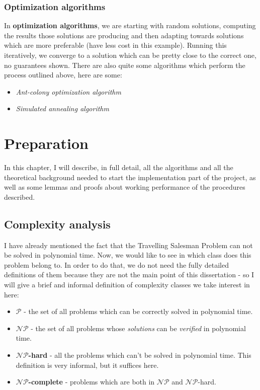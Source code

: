 \documentclass[12pt,twoside,notitlepage]{report}
\begin{document}
\subsection{Optimization algorithms}

In {\bf optimization algorithms}, we are starting with random solutions, computing the results those solutions are producing and then adapting towards solutions which are more preferable (have less cost in this example). Running this iteratively, we converge to a solution which can be pretty close to the correct one, no guarantees shown. There are also quite some algorithms which perform the process outlined above, here are some:

\begin{itemize}

\item {\it Ant-colony optimization algorithm}
\item {\it Simulated annealing algorithm}

\end{itemize}

\cleardoublepage



\chapter{Preparation}

In this chapter, I will describe, in full detail, all the algorithms and all the theoretical background needed to start the implementation part of the project, as well as some lemmas and proofs about working performance of the procedures described.

\section{Complexity analysis}

I have already mentioned the fact that the Travelling Salesman Problem can not be solved in polynomial time. Now, we would like to see in which class does this problem belong to. In order to do that, we do not need the fully detailed definitions of them because they are not the main point of this dissertation - so I will give a brief and informal definition of complexity classes we take interest in here:

\begin{itemize}

\item {\bf $\mathcal{P}$} - the set of all problems which can be correctly solved in polynomial time.
\item {\bf $\mathcal{NP}$} - the set of all problems whose {\it solutions} can be {\it verified} in polynomial time.
\item {\bf $\mathcal{NP}$-hard} - all the problems which can't be solved in polynomial time. This definition is very informal, but it suffices here. %
\item {\bf $\mathcal{NP}$-complete} - problems which are both in $\mathcal{NP}$ and $\mathcal{NP}$-hard.

\end{itemize}
\end{document}

